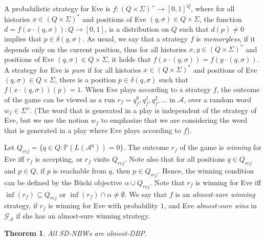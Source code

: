 \documentclass[10pt,a4paper]{amsart}
\newtheorem{thm}{Theorem}[section]
\theoremstyle{definition}
\numberwithin{equation}{section}
\newcommand{\buchi}{B\"uchi\xspace}
\newcommand{\A}{{\mathcal A}}
\newcommand{\G}{{\mathcal G}}
\renewcommand{\P}{\mathbb{P}}
\begin{document}
\noindent %
A probabilistic strategy for Eve is $f:(Q\times\Sigma)^+\rightarrow [0,1]^Q$, where for all histories $x\in (Q\times\Sigma)^*$ and positions of Eve $(q,\sigma)\in Q\times \Sigma$, the function $d=f(x\cdot (q,\sigma)):Q\rightarrow[0,1]$, is a distribution on $Q$ such that $d(p)\neq 0$ implies that $p\in \delta(q,\sigma)$. As usual, we say that a strategy $f$ is {\em memoryless\/}, if it depends only on the current position, thus for all histories $x,y\in (Q\times \Sigma)^*$ and positions of Eve $(q,\sigma)\in Q\times \Sigma$, it holds that $f(x\cdot (q,\sigma))=f(y\cdot (q,\sigma))$. A strategy for Eve is {\em pure\/} if for all histories $x\in (Q\times \Sigma)^*$ and positions of Eve $(q,\sigma)\in Q\times \Sigma$, there is a position $p\in \delta(q,\sigma)$ such that $f(x\cdot(q,\sigma))(p)=1$. When Eve plays according to a strategy $f$, the outcome of the game can be viewed as a run $r_f=q_f^0,q_f^1,q_f^2,\ldots$ in $\A$, over a random word $w_f\in \Sigma^\omega$. (The word that is generated in a play is independent of the strategy of Eve, but we use the notion $w_f$ to emphasize that we are considering the word that is generated in a play where Eve plays according to $f$). 

Let $Q_{rej}=\{q\in Q : \P(L(\A^q))=0\}$.
The outcome $r_f$ of the game is {\em winning\/} for Eve iff $r_f$ is accepting, or $r_f$ visits $Q_{rej}$. Note also that for all positions $q\in Q_{rej}$ and $p\in Q$, if $p$ is reachable from $q$, then $p\in Q_{rej}$. Hence, the winning condition can be defined by the \buchi objective $\alpha\cup Q_{rej}$. Note that $r_f$ is winning for Eve iff $\inf(r_f)\subseteq Q_{rej}$ or $\inf(r_f)\cap \alpha \neq \emptyset$. 
We say that $f$ is an {\em almost-sure winning\/} strategy, if $r_f$ is winning for Eve with probability $1$, and Eve {\em almost-sure wins} in $\G_\A$ if she has an almost-sure winning strategy.



\begin{thm}
\label{sd-nbw almost}
All SD-NBWs are almost-DBP.
\end{thm}
\end{document}
